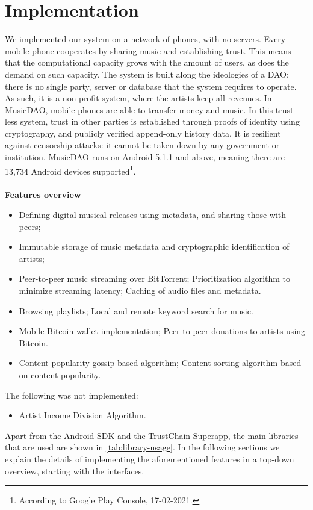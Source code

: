 \chapter{Implementation}
We implemented our system on a network of phones, with no servers. Every mobile phone cooperates by sharing music and establishing trust. This means that the computational capacity grows with the amount of users, as does the demand on such capacity. The system is built along the ideologies of a DAO: there is no single party, server or database that the system requires to operate. As such, it is a non-profit system, where the artists keep all revenues. In MusicDAO, mobile phones are able to transfer money and music. In this trust-less system, trust in other parties is established through proofs of identity using cryptography, and publicly verified append-only history data. It is resilient against censorship-attacks: it cannot be taken down by any government or institution. MusicDAO runs on Android 5.1.1 and above, meaning there are 13,734 Android devices supported\footnote{According to Google Play Console, 17-02-2021.}.
\\
\\
\textbf{Features overview}
\begin{itemize}
    \item Defining digital musical releases using metadata, and sharing those with peers;
    \item Immutable storage of music metadata and cryptographic identification of artists;
    \item Peer-to-peer music streaming over BitTorrent; Prioritization algorithm to minimize streaming latency; Caching of audio files and metadata.
    \item Browsing playlists; Local and remote keyword search for music.
    \item Mobile Bitcoin wallet implementation; Peer-to-peer donations to artists using Bitcoin.
    \item Content popularity gossip-based algorithm; Content sorting algorithm based on content popularity.
\end{itemize}
The following was not implemented:
\begin{itemize}
    \item Artist Income Division Algorithm.
\end{itemize}
Apart from the Android SDK and the TrustChain Superapp, the main libraries that are used are shown in \ref{tab:library-usage}. In the following sections we explain the details of implementing the aforementioned features in a top-down overview, starting with the interfaces.

